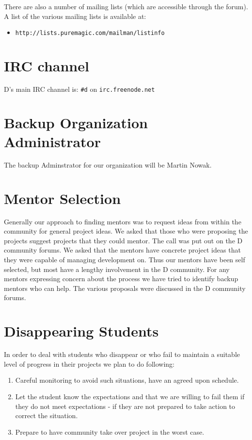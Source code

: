 \documentclass[	DIV=calc,%
							paper=a4,%
							fontsize=11pt,%
							twocolumn]{scrartcl}	 					%
\begin{document}
There are also a number of mailing lists (which are accessible 
through the forum).  A list of the various mailing lists is
available at:

\begin{itemize}
   \item \texttt{http://lists.puremagic.com/mailman/listinfo}
\end{itemize}

\section{IRC channel}
D's main IRC channel is:  \texttt{\#d} on \texttt{irc.freenode.net}

\section{Backup Organization Administrator}
The backup Adminstrator for our organization will be Martin Nowak.

\section{Mentor Selection}

Generally our approach to finding mentors was to request ideas
from within the community for general project ideas. We asked
that those who were proposing the projects suggest projects that
they could mentor. The call was put out on the D community forums.
We asked that the mentors have concrete project ideas that
they were capable of managing development on.  Thus our mentors
have been self selected, but most have a lengthy involvement 
in the D community. For any mentors expressing concern about the
process we have tried to identify backup mentors who can help. 
The various proposals were discussed in the D community forums. 

\section{Disappearing Students}
In order to deal with students who disappear or who fail to
maintain a suitable level of progress in their projects we plan
to do following:

\begin{enumerate}
\item Careful monitoring to avoid such situations, have an agreed upon
schedule.
\item Let the student know the expectations and that we are willing
to fail them if they do not meet expectations - if they are not prepared 
to take action to correct the situation.
\item Prepare to have community take over project in the worst case.
\end{enumerate}
\end{document}
